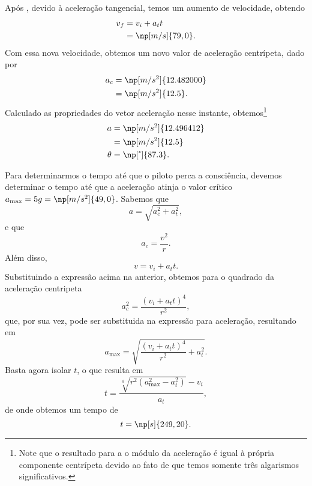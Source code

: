 Após , devido à aceleração tangencial, temos um aumento de velocidade, obtendo
\begin{align}
	v_f &= v_i + a_t t \\
	&= \np[m/s]{79,0}.
\end{align}
%
Com essa nova velocidade, obtemos um novo valor de aceleração centrípeta, dado por
\begin{align}
	a_c &= \np[m/s^2]{12.482000} \\
	&= \np[m/s^2]{12.5}.
\end{align}
%
Calculado as propriedades do vetor aceleração nesse instante, obtemos\footnote{Note que o resultado para a o módulo da aceleração é igual à própria componente centrípeta devido ao fato de que temos somente três algarismos significativos.}
\begin{align}
	a &= \np[m/s^2]{12.496412} \\
	&= \np[m/s^2]{12.5} \\
	\theta &= \np[\tcdegree]{87.3}.
\end{align}

Para determinarmos o tempo até que o piloto perca a consciência, devemos determinar o tempo até que a aceleração atinja o valor crítico $a_{\textrm{max}} = 5g = \np[m/s^2]{49,0}$. Sabemos que
\begin{equation}
	a = \sqrt{a_c^2 + a_t^2},
\end{equation}
%
e que
\begin{equation}
	a_c = \frac{v^2}{r}.
\end{equation}
%
Além disso,
\begin{equation}
	v = v_i + a_t t.
\end{equation}
%
Substituindo a expressão acima na anterior, obtemos para o quadrado da aceleração centripeta
\begin{equation}
	a_c^2 = \frac{(v_i + a_t t)^4}{r^2},
\end{equation}
%
que, por sua vez, pode ser substituida na expressão para aceleração, resultando em
\begin{equation}
	a_{\textrm{max}} = \sqrt{\frac{(v_i + a_t t)^4}{r^2} + a_t^2}.
\end{equation}
%
Basta agora isolar $t$, o que resulta em
\begin{equation}
	t = \frac{\sqrt[4]{r^2(a_{\textrm{max}}^2 - a_t^2)} - v_i}{a_t},
\end{equation}
%
de onde obtemos um tempo de
\begin{equation}
	t = \np[s]{249,20}.
\end{equation}

